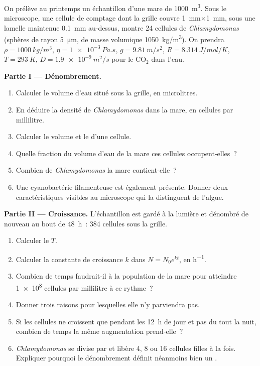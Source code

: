 \begin{problem}
\label{pb:b2:unicellular-diversity:1}
On prélève au printemps un échantillon d'une mare de \qty{1000}{m^3}.
Sous le microscope, une cellule de comptage dont la grille couvre
\qty{1}{mm}$\times$\qty{1}{mm}, sous une lamelle maintenue
\qty{0.1}{mm} au-dessus, montre 24 cellules de \emph{Chlamydomonas}
(sphères de rayon \qty{5}{\micro m}, de masse volumique
\qty{1050}{kg/m^3}). On prendra $\rho = \qty{1000}{kg/m^3}$,
$\eta = \qty{1e-3}{Pa.s}$, $g = \qty{9.81}{m/s^2}$, $R =
\qty{8.314}{J/mol/K}$, $T = \qty{293}{K}$, $D = \qty{1.9e-9}{m^2/s}$
pour le $\mathrm{CO_2}$ dans l'eau.

\medskip
\noindent\textbf{Partie I --- Dénombrement.}
\begin{enumerate}
  \item Calculer le volume d'eau situé sous la grille, en microlitres.
  \item En déduire la densité de \emph{Chlamydomonas} dans la mare, en
        cellules par millilitre.
  \item Calculer le volume et le  d'une cellule.
  \item Quelle fraction du volume d'eau de la mare ces cellules
        occupent-elles~?
  \item Combien de \emph{Chlamydomonas} la mare contient-elle~?
  \item Une cyanobactérie filamenteuse est également présente. Donner
        deux caractéristiques visibles au microscope qui la distinguent
        de l'algue.
\end{enumerate}

\medskip
\noindent\textbf{Partie II --- Croissance.}
L'échantillon est gardé à la lumière et dénombré de nouveau au bout de
\qty{48}{h}~: \num{384} cellules sous la grille.
\begin{enumerate}[resume]
  \item Calculer le  $T$.
  \item Calculer la constante de croissance $k$ dans $N = N_0 e^{kt}$,
        en \unit{h^{-1}}.
  \item Combien de temps faudrait-il à la population de la mare pour
        atteindre \qty{1e8}{} cellules par millilitre à ce rythme~?
  \item Donner trois raisons pour lesquelles elle n'y parviendra pas.
  \item Si les cellules ne croissent que pendant les \qty{12}{h} de jour
        et pas du tout la nuit, combien de temps la même augmentation
        prend-elle~?
  \item \emph{Chlamydomonas} se divise par  et libère
        4, 8 ou 16 cellules filles à la fois. Expliquer pourquoi le
        dénombrement définit néanmoins bien un .
\end{enumerate}


\end{problem}
